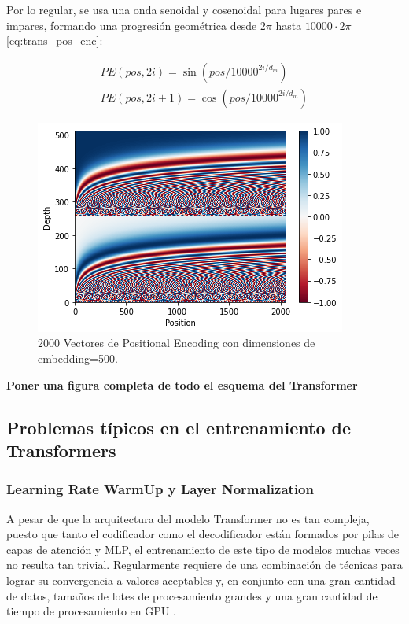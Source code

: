 Por lo regular, se usa una onda senoidal y cosenoidal para lugares pares e impares, formando una
progresión geométrica desde $2\pi$ hasta $10000 \cdot 2\pi$ \ref{eq:trans_pos_enc}:


\begin{equation}
    \begin{split}
        PE(pos, 2i) = \sin(pos/10000^{2i/d_m})\\
        PE(pos, 2i+1) = \cos(pos/10000^{2i/d_m})
    \end{split}
    \label{eq:trans_pos_enc}
\end{equation}


\begin{figure}[ht!]
    \centering
    \includegraphics[width=0.5 \textwidth]{Chapters/2. Transformer/Figures/transformer/pos_enc.png}
    \caption{2000 Vectores de Positional Encoding con dimensiones de embedding=500.}
    \label{fig:trans_pos_enc}
\end{figure}

\textbf{Poner una figura completa de todo el esquema del Transformer}

\subsection{Problemas típicos en el entrenamiento de Transformers}

\subsubsection{Learning Rate WarmUp y Layer Normalization}

A pesar de que la arquitectura del modelo Transformer no es tan compleja, puesto que tanto el
codificador como el decodificador están formados por pilas de capas de atención y MLP, el
entrenamiento de este tipo de modelos muchas veces no resulta tan trivial. Regularmente requiere de
una combinación de técnicas para lograr su convergencia a valores aceptables y, en conjunto con una
gran cantidad de datos, tamaños de lotes de procesamiento grandes y una gran cantidad de tiempo de
procesamiento en GPU \cite{DBLP:journals/corr/abs-1804-00247}.

